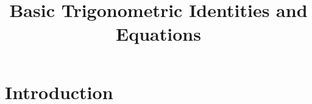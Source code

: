 \documentclass{beamer}
\title{Basic Trigonometric Identities and Equations}
\begin{document}
\maketitle

\section{Introduction}






\end{document}
